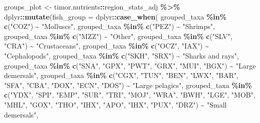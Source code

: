 \documentclass[
]{book}
\newenvironment{Shaded}{\begin{snugshade}}{\end{snugshade}}
\newcommand{\AttributeTok}[1]{\textcolor[rgb]{0.13,0.29,0.53}{#1}}
\newcommand{\FunctionTok}[1]{\textcolor[rgb]{0.13,0.29,0.53}{\textbf{#1}}}
\newcommand{\NormalTok}[1]{#1}
\newcommand{\OtherTok}[1]{\textcolor[rgb]{0.56,0.35,0.01}{#1}}
\newcommand{\SpecialCharTok}[1]{\textcolor[rgb]{0.81,0.36,0.00}{\textbf{#1}}}
\newcommand{\StringTok}[1]{\textcolor[rgb]{0.31,0.60,0.02}{#1}}
\begin{document}
\begin{Shaded}
\begin{Highlighting}[]
\NormalTok{groups\_plot }\OtherTok{\textless{}{-}}
\NormalTok{  timor.nutrients}\SpecialCharTok{::}\NormalTok{region\_stats\_adj }\SpecialCharTok{\%\textgreater{}\%}
\NormalTok{  dplyr}\SpecialCharTok{::}\FunctionTok{mutate}\NormalTok{(}\AttributeTok{fish\_group =}\NormalTok{ dplyr}\SpecialCharTok{::}\FunctionTok{case\_when}\NormalTok{(}
\NormalTok{    grouped\_taxa }\SpecialCharTok{\%in\%} \FunctionTok{c}\NormalTok{(}\StringTok{"COZ"}\NormalTok{) }\SpecialCharTok{\textasciitilde{}} \StringTok{"Molluscs"}\NormalTok{,}
\NormalTok{    grouped\_taxa }\SpecialCharTok{\%in\%} \FunctionTok{c}\NormalTok{(}\StringTok{"PEZ"}\NormalTok{) }\SpecialCharTok{\textasciitilde{}} \StringTok{"Shrimps"}\NormalTok{,}
\NormalTok{    grouped\_taxa }\SpecialCharTok{\%in\%} \FunctionTok{c}\NormalTok{(}\StringTok{"MZZ"}\NormalTok{) }\SpecialCharTok{\textasciitilde{}} \StringTok{"Other"}\NormalTok{,}
\NormalTok{    grouped\_taxa }\SpecialCharTok{\%in\%} \FunctionTok{c}\NormalTok{(}\StringTok{"SLV"}\NormalTok{, }\StringTok{"CRA"}\NormalTok{) }\SpecialCharTok{\textasciitilde{}} \StringTok{"Crustaceans"}\NormalTok{,}
\NormalTok{    grouped\_taxa }\SpecialCharTok{\%in\%} \FunctionTok{c}\NormalTok{(}\StringTok{"OCZ"}\NormalTok{, }\StringTok{"IAX"}\NormalTok{) }\SpecialCharTok{\textasciitilde{}} \StringTok{"Cephalopods"}\NormalTok{,}
\NormalTok{    grouped\_taxa }\SpecialCharTok{\%in\%} \FunctionTok{c}\NormalTok{(}\StringTok{"SKH"}\NormalTok{, }\StringTok{"SRX"}\NormalTok{) }\SpecialCharTok{\textasciitilde{}} \StringTok{"Sharks and rays"}\NormalTok{,}
\NormalTok{    grouped\_taxa }\SpecialCharTok{\%in\%} \FunctionTok{c}\NormalTok{(}\StringTok{"SNA"}\NormalTok{, }\StringTok{"GPX"}\NormalTok{, }\StringTok{"PWT"}\NormalTok{, }\StringTok{"GRX"}\NormalTok{, }\StringTok{"MUI"}\NormalTok{, }\StringTok{"BGX"}\NormalTok{) }\SpecialCharTok{\textasciitilde{}} \StringTok{"Large demersals"}\NormalTok{,}
\NormalTok{    grouped\_taxa }\SpecialCharTok{\%in\%} \FunctionTok{c}\NormalTok{(}\StringTok{"CGX"}\NormalTok{, }\StringTok{"TUN"}\NormalTok{, }\StringTok{"BEN"}\NormalTok{, }\StringTok{"LWX"}\NormalTok{, }\StringTok{"BAR"}\NormalTok{, }\StringTok{"SFA"}\NormalTok{, }\StringTok{"CBA"}\NormalTok{, }\StringTok{"DOX"}\NormalTok{, }\StringTok{"ECN"}\NormalTok{, }\StringTok{"DOS"}\NormalTok{) }\SpecialCharTok{\textasciitilde{}} \StringTok{"Large pelagics"}\NormalTok{,}
\NormalTok{    grouped\_taxa }\SpecialCharTok{\%in\%} \FunctionTok{c}\NormalTok{(}\StringTok{"YDX"}\NormalTok{, }\StringTok{"SPI"}\NormalTok{, }\StringTok{"EMP"}\NormalTok{, }\StringTok{"SUR"}\NormalTok{, }\StringTok{"TRI"}\NormalTok{, }\StringTok{"MOJ"}\NormalTok{, }\StringTok{"WRA"}\NormalTok{, }\StringTok{"BWH"}\NormalTok{, }\StringTok{"LGE"}\NormalTok{, }\StringTok{"MOB"}\NormalTok{, }\StringTok{"MHL"}\NormalTok{, }\StringTok{"GOX"}\NormalTok{, }\StringTok{"THO"}\NormalTok{, }\StringTok{"IHX"}\NormalTok{, }\StringTok{"APO"}\NormalTok{, }\StringTok{"IHX"}\NormalTok{, }\StringTok{"PUX"}\NormalTok{, }\StringTok{"DRZ"}\NormalTok{) }\SpecialCharTok{\textasciitilde{}} \StringTok{"Small demersals"}\NormalTok{,}

\end{Highlighting}
\end{Shaded}
\end{document}
